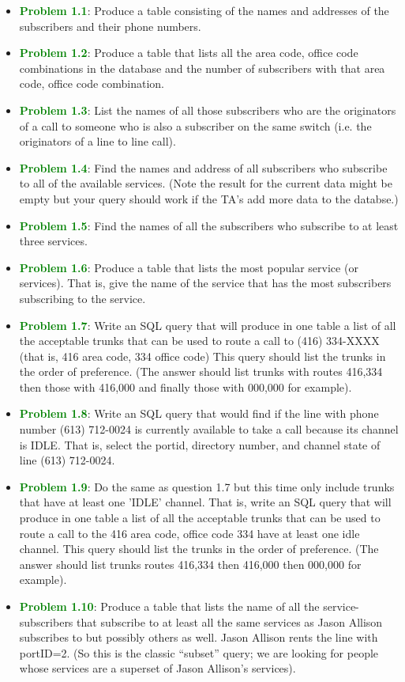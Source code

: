 \documentclass[12pt]{article}
\begin{document}
\begin{itemize}
    \item \textcolor{green}{\bfseries Problem 1.1}: Produce a table consisting of the names and addresses of the subscribers and their phone numbers.
    \item \textcolor{green}{\bfseries Problem 1.2}: Produce a table that lists all the area code, office code combinations in the database and the number of subscribers with that area code, office code combination.
    \item \textcolor{green}{\bfseries Problem 1.3}: List the names of all those subscribers who are the originators of a call to someone who is also a subscriber on the same switch (i.e. the originators of a line to line call).
    \item \textcolor{green}{\bfseries Problem 1.4}: Find the names and address of all subscribers who subscribe to all of the available services. (Note the result for the current data might be empty but your query should work if the TA's add more data to the databse.)
    \item \textcolor{green}{\bfseries Problem 1.5}: Find the names of all the subscribers who subscribe to at least three services.
    \item \textcolor{green}{\bfseries Problem 1.6}: Produce a table that lists the most popular service (or services). That is, give the name of the service that has the most subscribers subscribing to the service.
    \item \textcolor{green}{\bfseries Problem 1.7}: Write an SQL query that will produce in one table a list of all the acceptable trunks that can be used to route a call to (416) 334-XXXX (that is, 416 area code, 334 office code) This query should list the trunks in the order of preference. (The answer should list trunks with routes 416,334 then those with 416,000 and finally those with 000,000 for example).
    \item \textcolor{green}{\bfseries Problem 1.8}: Write an SQL query that would find if the line with phone number (613) 712-0024 is currently available to take a call because its channel is IDLE. That is, select the portid, directory number, and channel state of line (613) 712-0024.
    \item \textcolor{green}{\bfseries Problem 1.9}: Do the same as question 1.7 but this time only include trunks that have at least one 'IDLE' channel. That is, write an SQL query that will produce in one table a list of all the acceptable trunks that can be used to route a call to the 416 area code, office code 334 have at least one idle channel. This query should list the trunks in the order of preference. (The answer should list trunks routes 416,334 then 416,000 then 000,000 for example).
    \item \textcolor{green}{\bfseries Problem 1.10}: Produce a table that lists the name of all the service-subscribers that subscribe to at least all the same services as Jason Allison subscribes to but possibly others as well. Jason Allison rents the line with portID=2. (So this is the classic ``subset'' query; we are looking for people whose services are a superset of Jason Allison's services).
\end{itemize}
\end{document}

